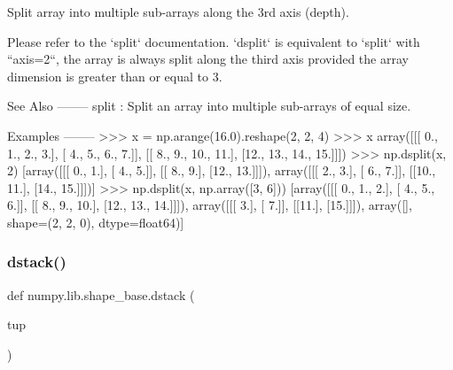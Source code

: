 \begin{DoxyVerb}Split array into multiple sub-arrays along the 3rd axis (depth).

Please refer to the `split` documentation.  `dsplit` is equivalent
to `split` with ``axis=2``, the array is always split along the third
axis provided the array dimension is greater than or equal to 3.

See Also
--------
split : Split an array into multiple sub-arrays of equal size.

Examples
--------
>>> x = np.arange(16.0).reshape(2, 2, 4)
>>> x
array([[[ 0.,   1.,   2.,   3.],
        [ 4.,   5.,   6.,   7.]],
       [[ 8.,   9.,  10.,  11.],
        [12.,  13.,  14.,  15.]]])
>>> np.dsplit(x, 2)
[array([[[ 0.,  1.],
        [ 4.,  5.]],
       [[ 8.,  9.],
        [12., 13.]]]), array([[[ 2.,  3.],
        [ 6.,  7.]],
       [[10., 11.],
        [14., 15.]]])]
>>> np.dsplit(x, np.array([3, 6]))
[array([[[ 0.,   1.,   2.],
        [ 4.,   5.,   6.]],
       [[ 8.,   9.,  10.],
        [12.,  13.,  14.]]]),
 array([[[ 3.],
        [ 7.]],
       [[11.],
        [15.]]]),
array([], shape=(2, 2, 0), dtype=float64)]
\end{DoxyVerb}
 \mbox{\label{namespacenumpy_1_1lib_1_1shape__base_a0bed809dc8726e451e41ee6b77577ddb}} 
\subsubsection{\texorpdfstring{dstack()}{dstack()}}
{\footnotesize\ttfamily def numpy.\+lib.\+shape\+\_\+base.\+dstack (\begin{DoxyParamCaption}\item[{}]{tup }\end{DoxyParamCaption})}

